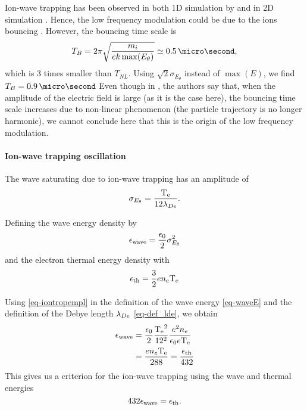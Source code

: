     Ion-wave trapping has been observed in both \ac{1D} simulation by \citet{lafleur2016a} and in \ac{2D} simulation \citep{croes2017a}.
    Hence, the low frequency modulation could be due to the ions bouncing \citep{belmont2013}.
    However, the bouncing time scale is 
    \begin{equation} \label{eq-TB}
      T_{B} = 2 \pi \sqrt{\frac{m_i}{e k \max(E_{\theta})} } \simeq 0.5 \,\micro\second,
    \end{equation}
    which is 3 times smaller than $T_{NL}$.
    Using $\sqrt{2} \sigma_{E_{\theta}}$ instead of $\max(E)$, we find $T_B = 0.9\,\micro\second$
    Even though in \citet{belmont2013}, the authors say that, when the amplitude of the electric field is large (as it is the case here), the bouncing time scale increases due to non-linear phenomenon (the particle trajectory is no longer harmonic), we cannot conclude here that this is the origin of the low frequency modulation.

  
  \paragraph{Ion-wave trapping oscillation\\}
    The wave saturating due to ion-wave trapping has an amplitude of \citep{lafleur2017,boeuf2018}
     \begin{equation} \label{eq-iontropempl}
       \sigma_{E_{\theta}} = \frac{\mathrm{T_e}}{12 \lambda_{De}}.
     \end{equation}
    
    Defining the wave energy  density by
    \begin{equation} \label{eq-waveE}
      \epsilon_{\rm wave} = \frac{\epsilon_0}{2} \sigma_{E_{\theta}}^2
    \end{equation}
    and the electron thermal energy density with
    \begin{equation} \label{eq-thE}
      \epsilon_{\rm th} = \frac{3}{2} e n_e \mathrm{T_e}
    \end{equation}
    
    Using \cref{eq-iontropempl} in the definition of the wave energy \cref{eq-waveE} and the definition of the Debye length $\lambda_{De}$ \cref{eq-def_lde}, we obtain
    \begin{align*} \label{eq-step_1}
      \epsilon_{\rm wave} &=  \frac{\epsilon_0}{2} \frac{\mathrm{T_e}^2}{12^2} \frac{e^2 n_e}{ \epsilon_0 e\mathrm{T_e}}\\
      &= \frac{e n_e \mathrm{T_e} }{288} = \frac{\epsilon_{\rm th}}{432}
    \end{align*}
    This gives us a criterion for the ion-wave trapping using the wave and thermal energies
    \begin{equation} \label{eq-criteriaIT}
      432 \epsilon_{\rm wave} = \epsilon_{\rm th}.
    \end{equation}
    
